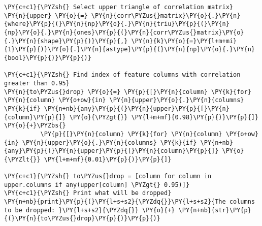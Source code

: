\begin{tcolorbox}[breakable, size=fbox, boxrule=1pt, pad at break*=1mm,colback=cellbackground, colframe=cellborder]
\begin{Verbatim}[commandchars=\\\{\}]
\PY{c+c1}{\PYZsh{} Select upper triangle of correlation matrix}
\PY{n}{upper} \PY{o}{=} \PY{n}{corr\PYZus{}matrix}\PY{o}{.}\PY{n}{where}\PY{p}{(}\PY{n}{np}\PY{o}{.}\PY{n}{triu}\PY{p}{(}\PY{n}{np}\PY{o}{.}\PY{n}{ones}\PY{p}{(}\PY{n}{corr\PYZus{}matrix}\PY{o}{.}\PY{n}{shape}\PY{p}{)}\PY{p}{,} \PY{n}{k}\PY{o}{=}\PY{l+m+mi}{1}\PY{p}{)}\PY{o}{.}\PY{n}{astype}\PY{p}{(}\PY{n}{np}\PY{o}{.}\PY{n}{bool}\PY{p}{)}\PY{p}{)}

\PY{c+c1}{\PYZsh{} Find index of feature columns with correlation greater than 0.95}
\PY{n}{to\PYZus{}drop} \PY{o}{=} \PY{p}{[}\PY{n}{column} \PY{k}{for} \PY{n}{column} \PY{o+ow}{in} \PY{n}{upper}\PY{o}{.}\PY{n}{columns} \PY{k}{if} \PY{n+nb}{any}\PY{p}{(}\PY{n}{upper}\PY{p}{[}\PY{n}{column}\PY{p}{]} \PY{o}{\PYZgt{}} \PY{l+m+mf}{0.98}\PY{p}{)}\PY{p}{]} \PY{o}{+}\PYZbs{}
          \PY{p}{[}\PY{n}{column} \PY{k}{for} \PY{n}{column} \PY{o+ow}{in} \PY{n}{upper}\PY{o}{.}\PY{n}{columns} \PY{k}{if} \PY{n+nb}{any}\PY{p}{(}\PY{n}{upper}\PY{p}{[}\PY{n}{column}\PY{p}{]} \PY{o}{\PYZlt{}} \PY{l+m+mf}{0.01}\PY{p}{)}\PY{p}{]}

\PY{c+c1}{\PYZsh{} to\PYZus{}drop = [column for column in upper.columns if any(upper[column] \PYZgt{} 0.95)]}
\PY{c+c1}{\PYZsh{} Print what will be dropped}
\PY{n+nb}{print}\PY{p}{(}\PY{l+s+s2}{\PYZdq{}}\PY{l+s+s2}{The columns to be dropped: }\PY{l+s+s2}{\PYZdq{}} \PY{o}{+} \PY{n+nb}{str}\PY{p}{(}\PY{n}{to\PYZus{}drop}\PY{p}{)}\PY{p}{)}
\end{Verbatim}
\end{tcolorbox}



